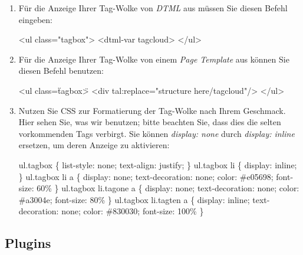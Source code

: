 \begin{enumerate}
    \item Für die Anzeige Ihrer Tag-Wolke von \textit{DTML} aus müssen Sie diesen Befehl eingeben: 

    <ul class="tagbox">\newline
        <dtml-var tagcloud>\newline
    </ul> \newline

    \item Für die Anzeige Ihrer Tag-Wolke von einem \textit{Page Template} aus können Sie diesen Befehl benutzen: 

    <ul class=\"tagbox\">\newline
        <div tal:replace="structure here/tagcloud"/>\newline
    </ul>\newline

    \item Nutzen Sie CSS zur Formatierung der Tag-Wolke nach Ihrem Geschmack. Hier sehen Sie, was wir benutzen; bitte beachten Sie, dass dies die selten vorkommenden Tags verbirgt. Sie können \textit{display: none} durch \textit{display: inline} ersetzen, um deren Anzeige zu aktivieren: 

    ul.tagbox \{ list-style: none; text-align: justify; \}\newline
    ul.tagbox li \{ display: inline; \}\newline
    ul.tagbox li a \{ display: none; text-decoration: none; color: \#e05698; font-size: 60\% \} \newline
    ul.tagbox li.tagone a \{  display: none; text-decoration: none; color: \#a3004e; font-size: 80\% \} \newline
    ul.tagbox li.tagten a \{  display: inline; text-decoration: none; color: \#830030; font-size: 100\% \} \newline
\end{enumerate}

\subsection{Plugins} 
